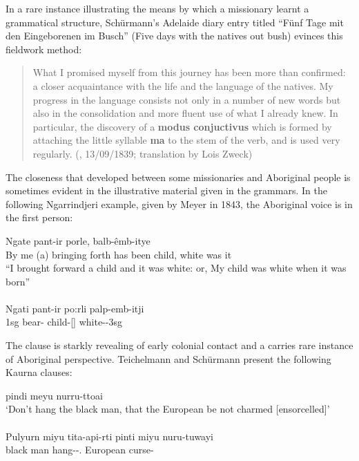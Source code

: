 In a rare instance illustrating the means by which a missionary learnt a grammatical structure, Schürmann’s Adelaide diary entry titled “Fünf Tage mit den Eingeborenen im Busch” (Five days with the natives out bush) evinces this fieldwork method:
\begin{quote}
    What I promised myself from this journey has been more than confirmed: a closer acquaintance with the life and the language of the natives. My progress in the language consists not only in a number of new words but also in the consolidation and more fluent use of what I already knew. In particular, the discovery of a \textbf{modus conjuctivus} which is formed by attaching the little syllable \textbf{ma} to the stem of the verb, and is used very regularly. (\citealt{schurmann_diaries_1838}, 13/09/1839; translation by Lois Zweck)
\end{quote}

The closeness that developed between some missionaries and Aboriginal people is sometimes evident in the illustrative material given in the grammars. In the following Ngarrindjeri example, given by Meyer in 1843, the Aboriginal voice is in the first person:

\ea\label{ex:1:3}
\gll Ngate pant-ir porle, balb-êmb-itye \\
{By me (a)} {bringing forth has been} child, {white was it} \\
\glt “I brought forward a child and it was white: or, My child was white when it was born” \\
\citep[36]{meyer_vocabulary_1843} \\
\gll Ngati pant-ir po:rli palp-emb-itji\\
1sg bear- child-[] white--3sg\\
\z

The clause is starkly revealing of early colonial contact and a carries rare instance of Aboriginal perspective. Teichelmann and Schürmann present the following Kaurna clauses:

\ea
{} {pindi  meyu nurru-ttoai} \\
{`Don’t hang the black man,} {that the European be not charmed [ensorcelled]'} \\
\glt \citep[69]{teichelmann_outlines_1840}\\
\gll Pulyurn miyu tita-api-rti {pinti miyu} nuru-tuwayi\\
black man hang--. European curse-\\
\z
	       
